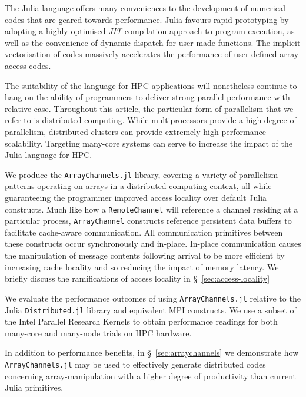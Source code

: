 The Julia language offers many conveniences to the development of
numerical codes that are geared towards performance. Julia favours rapid
prototyping by adopting a highly optimised \textit{JIT} compilation approach to
program execution, as well as the convenience of dynamic dispatch for
user-made functions. The implicit vectorisation of codes massively
accelerates the performance of user-defined array access codes.

The suitability of the language for HPC applications will nonetheless
continue to hang on the ability of programmers to deliver strong
parallel performance with relative ease. Throughout this article, the
particular form of parallelism that we refer to is distributed
computing. While multiprocessors provide a high degree of parallelism, distributed clusters can provide extremely high performance scalability. Targeting many-core systems can serve to increase the impact of the Julia language for HPC.

We produce the \texttt{ArrayChannels.jl} library, covering a variety of
parallelism patterns operating on arrays in a distributed computing
context, all while guaranteeing the programmer improved access locality
over default Julia constructs. Much like how a \texttt{RemoteChannel} will reference a channel residing at a particular process, \texttt{ArrayChannel} constructs reference persistent data buffers to facilitate cache-aware communication.
All communication primitives between these
constructs occur synchronously and in-place. In-place communication
causes the manipulation of message contents following arrival to be more
efficient by increasing cache locality and so reducing the impact of
memory latency. We briefly discuss the ramifications of access locality in
\S~\ref{sec:access-locality}

We evaluate the performance outcomes of using \texttt{ArrayChannels.jl}
relative to the Julia \texttt{Distributed.jl} library and
equivalent MPI constructs. We use a subset of the Intel
Parallel Research Kernels to obtain performance readings for both
many-core and many-node trials on HPC hardware.

In addition to performance benefits, in \S~\ref{sec:arraychannels}
we demonstrate how \texttt{ArrayChannels.jl} may be used to effectively
generate distributed codes concerning array-manipulation with a higher
degree of productivity than current Julia primitives.
